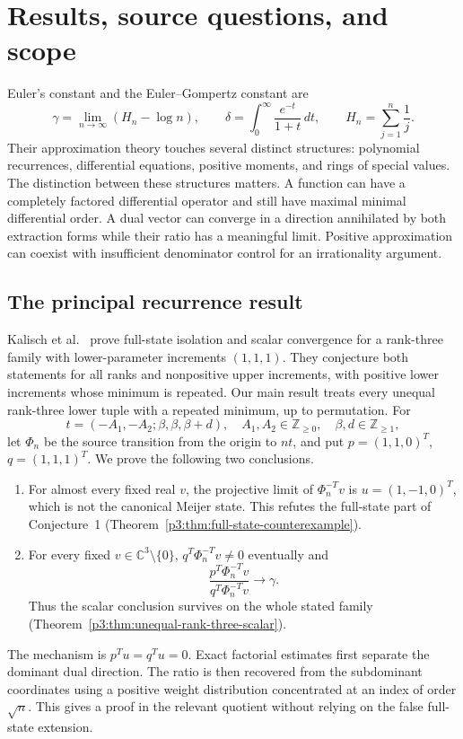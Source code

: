 \documentclass[11pt,a4paper]{article}
\theoremstyle{definition}
\theoremstyle{remark}
\numberwithin{equation}{section}
\begin{document}
\section{Results, source questions, and scope}
\label{p3:sec:introduction}

Euler's constant and the Euler--Gompertz constant are
\[
 \gamma=\lim_{n\to\infty}(H_n-\log n),\qquad
 \delta=\int_0^\infty\frac{e^{-t}}{1+t}\,dt,
 \qquad H_n=\sum_{j=1}^n\frac1j.
\]
Their approximation theory touches several distinct structures: polynomial
recurrences, differential equations, positive moments, and rings of special
values. The distinction between these structures matters. A function can
have a completely factored differential operator and still have maximal
minimal differential order. A dual vector can converge in a direction
annihilated by both extraction forms while their ratio has a meaningful
limit. Positive approximation can coexist with insufficient denominator
control for an irrationality argument.

\subsection{The principal recurrence result}

Kalisch et al.~\cite[Definitions 20--21, Conjecture 1]{p3:KMLWSK26}
prove full-state isolation and scalar convergence for a rank-three family
with lower-parameter increments $(1,1,1)$. They conjecture both statements
for all ranks and nonpositive upper increments, with positive lower
increments whose minimum is repeated. Our main result treats every
unequal rank-three lower tuple with a repeated minimum, up to permutation.
For
\[
 t=(-A_1,-A_2;\beta,\beta,\beta+d),\quad
 A_1,A_2\in\mathbb Z_{\ge0},\quad \beta,d\in\mathbb Z_{\ge1},
\]
let $\Phi_n$ be the source transition from the origin to $nt$, and put
$p=(1,1,0)^T$, $q=(1,1,1)^T$. We prove the following two conclusions.
\begin{enumerate}
\item For almost every fixed real $v$, the projective limit of
      $\Phi_n^{-T}v$ is $u=(1,-1,0)^T$, which is not the canonical
      Meijer state. This refutes the full-state part of Conjecture~1
      (Theorem~\ref{p3:thm:full-state-counterexample}).
\item For every fixed $v\in\mathbb C^3\setminus\{0\}$,
      $q^T\Phi_n^{-T}v\ne0$ eventually and
      \[
       \frac{p^T\Phi_n^{-T}v}{q^T\Phi_n^{-T}v}\longrightarrow\gamma.
      \]
      Thus the scalar conclusion survives on the whole stated family
      (Theorem~\ref{p3:thm:unequal-rank-three-scalar}).
\end{enumerate}
The mechanism is $p^Tu=q^Tu=0$. Exact factorial estimates first separate
the dominant dual direction. The ratio is then recovered from the
subdominant coordinates using a positive weight distribution concentrated
at an index of order $\sqrt n$. This gives a proof in the relevant
quotient without relying on the false full-state extension.
\end{document}
